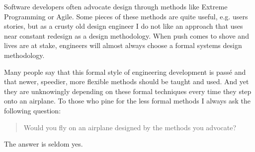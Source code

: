 \begin{slshape}
Software developers often advocate design through methods like Extreme Programming or Agile.  Some pieces of these methods are quite useful, e.g. users stories, but as a crusty old design engineer I do not like an approach that uses near constant redesign as a design methodology.  When push comes to shove and lives are at stake, engineers will almost always choose a formal systems design methodology.
\bigskip  

Many people say that this formal style of engineering development is pass\'{e} and that newer, speedier, more flexible methods should be taught and used.  And yet they are unknowingly depending on these formal techniques every time they step onto an airplane.  To those who pine for the less formal methods I always ask the following question:

\begin{quote}
Would you fly on an airplane designed by the methods you advocate?
\end{quote}

The answer is seldom yes.

\end{slshape}

\newpage



